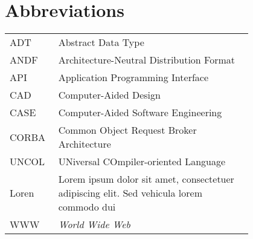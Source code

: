 \chapter*{Abbreviations}


\begin{flushleft}
\begin{tabular}{l p{0.8\linewidth}}
ADT      & Abstract Data Type\\
ANDF     & Architecture-Neutral Distribution Format\\
API      & Application Programming Interface\\
CAD      & Computer-Aided Design\\
CASE     & Computer-Aided Software Engineering\\
CORBA    & Common Object Request Broker Architecture\\
UNCOL    & UNiversal COmpiler-oriented Language\\
Loren    & Lorem ipsum dolor sit amet, consectetuer adipiscing
elit. Sed vehicula lorem commodo dui\\
WWW      & \emph{World Wide Web}
\end{tabular}
\end{flushleft}

